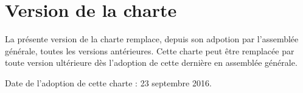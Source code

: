 \documentclass[12pt]{article}
\begin{document}
\section{Version de la charte}
La présente version de la charte remplace, depuis son adpotion par l'assemblée générale, toutes les versions antérieures. Cette charte peut être remplacée par toute version ultérieure dès l'adoption de cette dernière en assemblée générale.

Date de l'adoption de cette charte : 23 septembre 2016.
\end{document}
